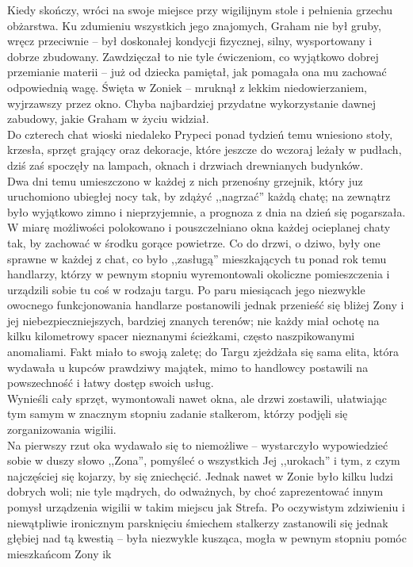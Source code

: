 \documentclass[../MAIN.tex]{subfiles}
\begin{document}
Kiedy skończy, wróci na swoje miejsce przy wigilijnym stole i pełnienia grzechu obżarstwa. Ku zdumieniu wszystkich jego znajomych, Graham nie był gruby, wręcz przeciwnie -- był doskonałej kondycji fizycznej, silny, wysportowany i dobrze zbudowany. Zawdzięczał to nie tyle ćwiczeniom, co wyjątkowo dobrej przemianie materii -- już od dziecka pamiętał, jak pomagała ona mu zachować odpowiednią wagę.
\sx Święta w Zonie\3k -- mruknął z lekkim niedowierzaniem, wyjrzawszy przez okno.
\qd
Chyba najbardziej przydatne wykorzystanie dawnej zabudowy, jakie Graham w życiu widział.\\
Do czterech chat wioski niedaleko Prypeci ponad tydzień temu wniesiono stoły, krzesła, sprzęt grający oraz dekoracje, które jeszcze do wczoraj leżały w pudłach, dziś zaś spoczęły na lampach, oknach i drzwiach drewnianych budynków.\\
Dwa dni temu umieszczono w każdej z nich przenośny grzejnik, który juz uruchomiono ubiegłej nocy tak, by zdążyć ,,nagrzać'' każdą chatę; na zewnątrz było wyjątkowo zimno i nieprzyjemnie, a prognoza z dnia na dzień się pogarszała. W miarę możliwości polokowano i pouszczelniano okna każdej ocieplanej chaty tak, by zachować w środku gorące powietrze. Co do drzwi, o dziwo, były one sprawne w każdej z chat, co było ,,zasługą'' mieszkających tu ponad rok temu handlarzy, którzy w pewnym stopniu wyremontowali okoliczne pomieszczenia i urządzili sobie tu coś w rodzaju targu. Po paru miesiącach jego niezwykle owocnego funkcjonowania handlarze postanowili jednak przenieść się bliżej Zony i jej niebezpieczniejszych, bardziej znanych terenów; nie każdy miał ochotę na kilku kilometrowy spacer nieznanymi ścieżkami, często naszpikowanymi anomaliami. Fakt miało to swoją zaletę; do Targu zjeżdżała się sama elita, która wydawała u kupców prawdziwy majątek, mimo to handlowcy postawili na powszechność i łatwy dostęp swoich usług.\\
Wynieśli cały sprzęt, wymontowali nawet okna, ale drzwi zostawili, ułatwiając tym samym w znacznym stopniu zadanie stalkerom, którzy podjęli się zorganizowania wigilii.\\
Na pierwszy rzut oka wydawało się to niemożliwe -- wystarczyło wypowiedzieć sobie w duszy słowo ,,Zona'', pomyśleć o wszystkich Jej ,,urokach'' i tym, z czym najczęściej się kojarzy, by się zniechęcić. Jednak nawet w Zonie było kilku ludzi dobrych woli; nie tyle mądrych, do odważnych, by choć zaprezentować innym pomysł urządzenia wigilii w takim miejscu jak Strefa. Po oczywistym zdziwieniu i niewątpliwie ironicznym parsknięciu śmiechem stalkerzy zastanowili się jednak głębiej nad tą kwestią -- była niezwykle kusząca, mogła w pewnym stopniu pomóc mieszkańcom Zony i\3k
\end{document}
